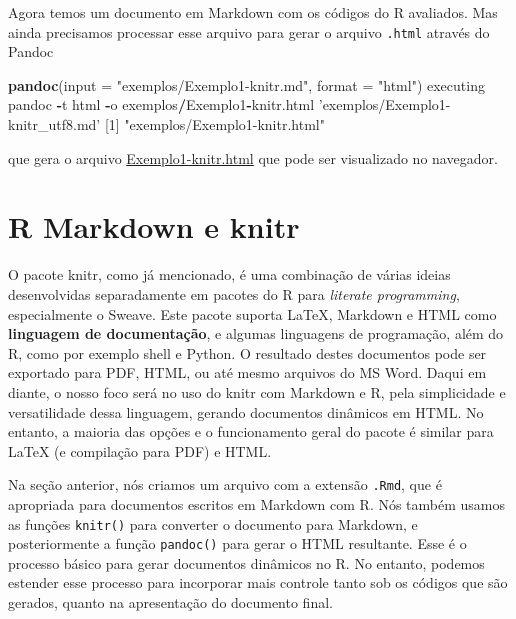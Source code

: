 \documentclass[10pt,a4paper]{book}
\newenvironment{Shaded}{\begin{snugshade}}{\end{snugshade}}
\newcommand{\KeywordTok}[1]{\textcolor[rgb]{0.13,0.29,0.53}{\textbf{#1}}}
\newcommand{\DataTypeTok}[1]{\textcolor[rgb]{0.13,0.29,0.53}{#1}}
\newcommand{\DecValTok}[1]{\textcolor[rgb]{0.00,0.00,0.81}{#1}}
\newcommand{\StringTok}[1]{\textcolor[rgb]{0.31,0.60,0.02}{#1}}
\newcommand{\OperatorTok}[1]{\textcolor[rgb]{0.81,0.36,0.00}{\textbf{#1}}}
\newcommand{\NormalTok}[1]{#1}
\begin{document}
Agora temos um documento em Markdown com os códigos do R avaliados. Mas
ainda precisamos processar esse arquivo para gerar o arquivo
\texttt{.html} através do Pandoc

\begin{Shaded}
\begin{Highlighting}[]
\KeywordTok{pandoc}\NormalTok{(}\DataTypeTok{input =} \StringTok{"exemplos/Exemplo1-knitr.md"}\NormalTok{, }\DataTypeTok{format =} \StringTok{"html"}\NormalTok{)}
\NormalTok{executing pandoc   }\OperatorTok{-}\NormalTok{t html }\OperatorTok{-}\NormalTok{o exemplos}\OperatorTok{/}\NormalTok{Exemplo1}\OperatorTok{-}\NormalTok{knitr.html }\StringTok{'exemplos/Exemplo1-knitr_utf8.md'}
\NormalTok{[}\DecValTok{1}\NormalTok{] }\StringTok{"exemplos/Exemplo1-knitr.html"}
\end{Highlighting}
\end{Shaded}

que gera o arquivo
\href{exemplos/Exemplo1-knitr.html}{Exemplo1-knitr.html} que pode ser
visualizado no navegador.

\section{R Markdown e knitr}\label{r-markdown-e-knitr}

O pacote knitr, como já mencionado, é uma combinação de várias ideias
desenvolvidas separadamente em pacotes do R para \emph{literate
programming}, especialmente o Sweave. Este pacote suporta LaTeX,
Markdown e HTML como \textbf{linguagem de documentação}, e algumas
linguagens de programação, além do R, como por exemplo shell e Python. O
resultado destes documentos pode ser exportado para PDF, HTML, ou até
mesmo arquivos do MS Word. Daqui em diante, o nosso foco será no uso do
knitr com Markdown e R, pela simplicidade e versatilidade dessa
linguagem, gerando documentos dinâmicos em HTML. No entanto, a maioria
das opções e o funcionamento geral do pacote é similar para LaTeX (e
compilação para PDF) e HTML.

Na seção anterior, nós criamos um arquivo com a extensão \texttt{.Rmd},
que é apropriada para documentos escritos em Markdown com R. Nós também
usamos as funções \texttt{knitr()} para converter o documento para
Markdown, e posteriormente a função \texttt{pandoc()} para gerar o HTML
resultante. Esse é o processo básico para gerar documentos dinâmicos no
R. No entanto, podemos estender esse processo para incorporar mais
controle tanto sob os códigos que são gerados, quanto na apresentação do
documento final.
\end{document}
